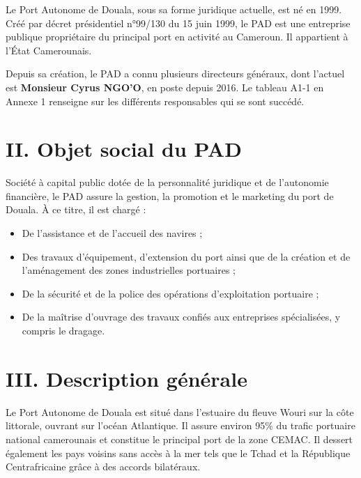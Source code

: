 \documentclass[a4paper,12pt,openany]{report}
\begin{document}
Le Port Autonome de Douala, sous sa forme juridique actuelle, est né en 1999. Créé par décret présidentiel n°99/130 du 15 juin 1999, le PAD est une entreprise publique propriétaire du principal port en activité au Cameroun. Il appartient à l’État Camerounais.

Depuis sa création, le PAD a connu plusieurs directeurs généraux, dont l’actuel est \textbf{Monsieur Cyrus NGO’O}, en poste depuis 2016. Le tableau A1-1 en Annexe 1 renseigne sur les différents responsables qui se sont succédé.


\section*{II. Objet social du PAD}

Société à capital public dotée de la personnalité juridique et de l’autonomie financière, le PAD assure la gestion, la promotion et le marketing du port de Douala. À ce titre, il est chargé :

\begin{itemize}
	\item De l’assistance et de l’accueil des navires ;
	\item Des travaux d’équipement, d’extension du port ainsi que de la création et de l’aménagement des zones industrielles portuaires ;
	\item De la sécurité et de la police des opérations d’exploitation portuaire ;
	\item De la maîtrise d’ouvrage des travaux confiés aux entreprises spécialisées, y compris le dragage.
\end{itemize}

\section*{III. Description générale}

Le Port Autonome de Douala est situé dans l’estuaire du fleuve Wouri sur la côte littorale, ouvrant sur l’océan Atlantique. Il assure environ 95\% du trafic portuaire national camerounais et constitue le principal port de la zone CEMAC. Il dessert également les pays voisins sans accès à la mer tels que le Tchad et la République Centrafricaine grâce à des accords bilatéraux.
	
\end{document}
